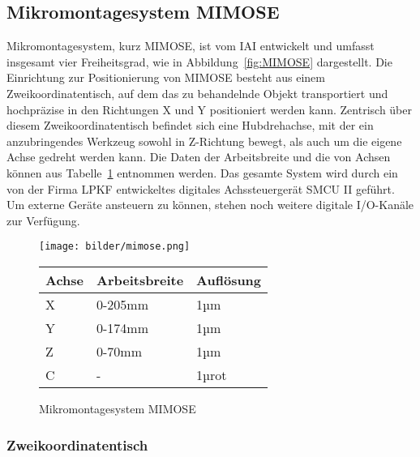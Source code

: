 \subsection{Mikromontagesystem MIMOSE}

Mikromontagesystem, kurz MIMOSE, ist vom IAI entwickelt und umfasst insgesamt vier Freiheitsgrad, wie in Abbildung~\ref{fig:MIMOSE} dargestellt. Die Einrichtung zur Positionierung von MIMOSE besteht aus einem Zweikoordinatentisch, auf dem das zu behandelnde Objekt transportiert und hochpräzise in den Richtungen X und Y positioniert werden kann. Zentrisch über diesem Zweikoordinatentisch befindet sich eine Hubdrehachse, mit der ein anzubringendes Werkzeug sowohl in Z-Richtung bewegt, als auch um die eigene Achse gedreht werden kann. Die Daten der Arbeitsbreite und die von Achsen können aus Tabelle~\ref{tab:Arbeitsbreite} entnommen werden. Das gesamte System wird durch ein von der Firma LPKF entwickeltes digitales Achssteuergerät SMCU II geführt. Um externe Geräte ansteuern zu können, stehen noch weitere digitale I/O-Kanäle zur Verfügung.

\begin{figure}[H]
\begin{minipage}[b]{0.6\linewidth}
    \centering
    \texttt{[image: bilder/mimose.png]}
    \caption{Mikromontagesystem MIMOSE}
    \label{fig:MIMOSE}
\end{minipage}
\begin{minipage}[b]{0.4\linewidth}
    \centering
    \begin{tabular}{l|l|l}
        \hline
        \normalsize
        Achse & Arbeitsbreite & Auflösung   \\
        \hline
        X & 0-205mm & 1µm \\
        Y & 0-174mm & 1µm \\
        Z & 0-70mm & 1µm \\
        C & - & 1µrot\\
        \hline
    \end{tabular}
    \label{tab:Arbeitsbreite}
\end{minipage}
\end{figure}

\subsubsection{Zweikoordinatentisch}


